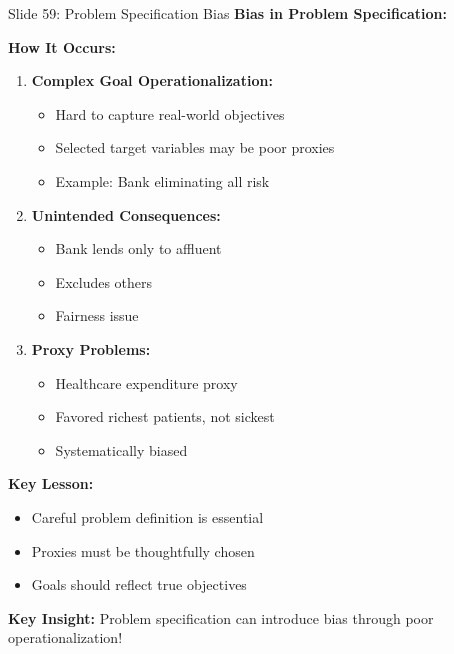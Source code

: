 \documentclass[8pt]{beamer}
\begin{document}
	\begin{frame}{Slide 59: Problem Specification Bias}
		\fontsize{6.5}{7.5}\selectfont
		\textbf{Bias in Problem Specification:}
		
		\vspace{0.1cm}
		\textbf{How It Occurs:}
		\begin{enumerate}
			\item \textbf{Complex Goal Operationalization:}
			\begin{itemize}
				\item Hard to capture real-world objectives
				\item Selected target variables may be poor proxies
				\item Example: Bank eliminating all risk
			\end{itemize}
			\item \textbf{Unintended Consequences:}
			\begin{itemize}
				\item Bank lends only to affluent
				\item Excludes others
				\item Fairness issue
			\end{itemize}
			\item \textbf{Proxy Problems:}
			\begin{itemize}
				\item Healthcare expenditure proxy
				\item Favored richest patients, not sickest
				\item Systematically biased
			\end{itemize}
		\end{enumerate}
		
		\vspace{0.1cm}
		\textbf{Key Lesson:}
		\begin{itemize}
			\item Careful problem definition is essential
			\item Proxies must be thoughtfully chosen
			\item Goals should reflect true objectives
		\end{itemize}
		
		\textcolor{myblue}{\textbf{Key Insight:}} Problem specification can introduce \textcolor{myblue}{bias through poor operationalization}!
	\end{frame}
	
\end{document}
